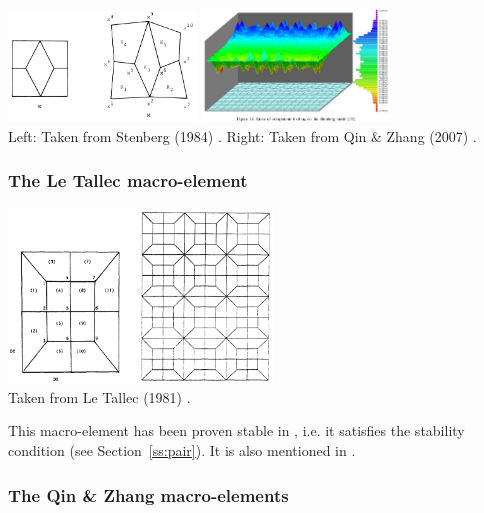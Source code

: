 \begin{center}
\includegraphics[width=5cm]{images/meshtopos/sten84}
\includegraphics[width=5cm]{images/meshtopos/qizh07}\\
{\captionfont Left: Taken from Stenberg (1984) \cite{sten84}. 
Right: Taken from Qin \& Zhang (2007) \cite{qizh07}.}
\end{center}

\subsubsection{The Le Tallec macro-element} 

\begin{center}
\includegraphics[width=7cm]{images/meshtopos/leta81}\\
{\captionfont Taken from Le Tallec (1981) \cite{leta81}.}
\end{center}
This macro-element has been proven stable in \cite{leta81,leru86}, i.e. it satisfies 
the stability condition (see Section~\ref{ss:pair}).
It is also mentioned in \cite{qizh07}.

\subsubsection{The Qin \& Zhang macro-elements}


